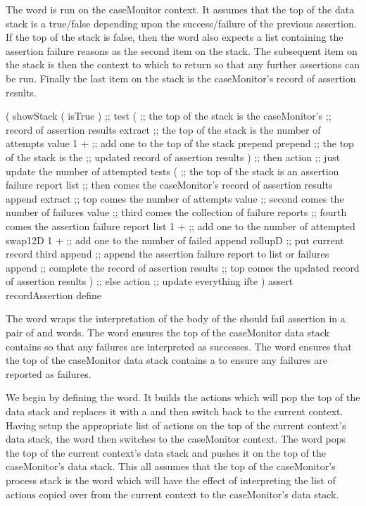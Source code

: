 
The  word is run on the caseMonitor context. It 
assumes that the top of the data stack is a true/false depending upon the 
success/failure of the previous assertion. If the top of the stack is 
false, then the  word also expects a list containing 
the assertion failure reasons as the second item on the stack. The 
subsequent item on the stack is then the context to which to return so 
that any further assertions can be run. Finally the last item on the stack 
is the caseMonitor's record of assertion results. 

\startJoylolCode
(
  showStack
  (
    isTrue
  )  ;; test
  (
    ;; the top of the stack is the caseMonitor's
    ;; record of assertion results
    extract
    ;; the top of the stack is the number of attempts value
    1 + ;; add one to the top of the stack
    prepend
    prepend
    ;; the top of the stack is the
    ;; updated record of assertion results
  )  ;; then action ;; just update the number of attempted tests 
  (
    ;; the top of the stack is an assertion failure report list
    ;; then comes the caseMonitor's record of assertion results
    append
    extract
    ;; top    comes the number of attempts value
    ;; second comes the number of failures value
    ;; third  comes the collection of failure reports
    ;; fourth comes the assertion failure report list
    1 + ;; add one to the number of attempted
    swap12D
    1 + ;; add one to the number of failed
    append
    rollupD ;; put current record third
    append  ;; append the assertion failure report to list or failures
    append  ;; complete the record of assertion results
    ;; top comes the updated record of assertion results
  )  ;; else action ;; update everything
  ifte
)
assert
recordAssertion
define
\stopJoylolCode
\stopTestSuite

\startTestSuite[assertShouldFail]

The  word wraps the interpretation of the body of 
the should fail assertion in a pair of  and 
 words. The  word ensures 
the top of the caseMonitor data stack contains  so that any 
failures are interpreted as successes. The  word 
ensures that the top of the caseMonitor data stack contains a  
to ensure any failures are reported as failures. 

We begin by defining the  word. It builds the 
actions which will pop the top of the data stack and replaces it with a 
 and then switch back to the current context. Having setup the 
appropriate list of actions on the top of the current context's data 
stack, the  word then switches to the caseMonitor 
context. The  word pops the top of the current context's 
data stack and pushes it on the top of the caseMonitor's data stack. This 
all assumes that the top of the caseMonitor's process stack is the 
 word which will have the effect of interpreting the list 
of actions copied over from the current context to the caseMonitor's data 
stack. 

